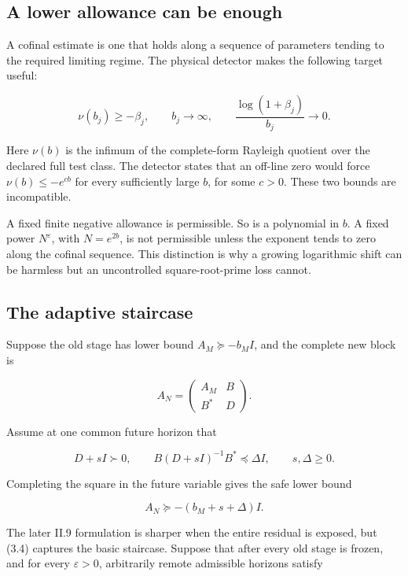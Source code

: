 \documentclass[
  10pt,
  a4paper,
  10pt,
  oneside,
  openany]{book}
\begin{document}
\subsection{A lower allowance can be
enough}\label{a-lower-allowance-can-be-enough}

A cofinal estimate is one that holds along a sequence of parameters
tending to the required limiting regime. The physical detector makes the
following target useful:

\[
\nu(b_j)\ge-\beta_j,
\qquad b_j\to\infty,
\qquad \frac{\log(1+\beta_j)}{b_j}\to0.
\tag{3.1}\label{eq:3.1}
\]

Here \(\nu(b)\) is the infimum of the complete-form Rayleigh quotient
over the declared full test class. The detector states that an off-line
zero would force \(\nu(b)\le-e^{cb}\) for every sufficiently large
\(b\), for some \(c>0\). These two bounds are incompatible.

A fixed finite negative allowance is permissible. So is a polynomial in
\(b\). A fixed power \(N^\varepsilon\), with \(N=e^{2b}\), is not
permissible unless the exponent tends to zero along the cofinal
sequence. This distinction is why a growing logarithmic shift can be
harmless but an uncontrolled square-root-prime loss cannot.

\subsection{The adaptive staircase}\label{the-adaptive-staircase}

Suppose the old stage has lower bound \(A_M\succeq-b_MI\), and the
complete new block is

\[
A_N=\begin{pmatrix}A_M&B\\B^*&D\end{pmatrix}.
\tag{3.2}\label{eq:3.2}
\]

Assume at one common future horizon that

\[
D+sI\succ0,
\qquad B(D+sI)^{-1}B^*\preceq\Delta I,
\qquad s,\Delta\ge0.
\tag{3.3}\label{eq:3.3}
\]

Completing the square in the future variable gives the safe lower bound

\[
A_N\succeq-(b_M+s+\Delta)I.
\tag{3.4}\label{eq:3.4}
\]

The later II.9 formulation is sharper when the entire residual is
exposed, but (3.4) captures the basic staircase. Suppose that after
every old stage is frozen, and for every \(\varepsilon>0\), arbitrarily
remote admissible horizons satisfy
\end{document}
